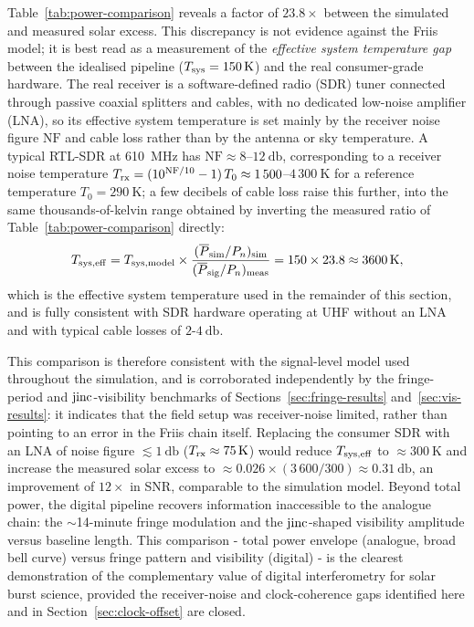 Table~\ref{tab:power-comparison} reveals a factor of $23.8\times$ between the
simulated and measured solar excess. This discrepancy is not evidence against the
Friis model; it is best read as a measurement of the \emph{effective system
temperature gap} between the idealised pipeline ($T_{\rm sys}=\SI{150}{\kelvin}$) and
the real consumer-grade hardware. The real receiver is a software-defined radio (SDR)
tuner connected through passive coaxial splitters and cables, with no dedicated
low-noise amplifier (LNA), so its effective system temperature is set mainly by the
receiver noise figure $\mathrm{NF}$ and cable loss rather than by the antenna or sky
temperature. A typical RTL-SDR at \SI{610}{\mega\hertz} has
$\mathrm{NF}\approx8$--$12~\si{\decibel}$, corresponding to a receiver noise
temperature $T_{\rm rx}=(10^{\mathrm{NF}/10}-1)\,T_0\approx1\,500$--$4\,300~\si{\kelvin}$
for a reference temperature $T_0=\SI{290}{\kelvin}$; a few decibels of cable loss
raise this further, into the same thousands-of-kelvin range obtained by inverting the
measured ratio of Table~\ref{tab:power-comparison} directly:
\begin{equation}
  T_{\rm sys,eff} = T_{\rm sys,model}
    \times\frac{(\overline{P}_{\rm sim}/P_n)_{\rm sim}}
               {(\overline{P}_{\rm sig}/P_n)_{\rm meas}}
  = 150\times23.8 \approx \SI{3\,600}{\kelvin},
  \label{eq:tsys-backcalc}
\end{equation}
which is the effective system temperature used in the remainder of this section, and
is fully consistent with SDR hardware operating at UHF without an LNA and with
typical cable losses of $2$-$4~\si{\decibel}$.

This comparison is therefore consistent with the signal-level model used throughout
the simulation, and is corroborated independently by the fringe-period and
$\operatorname{jinc}$-visibility benchmarks of Sections~\ref{sec:fringe-results}
and~\ref{sec:vis-results}: it indicates that the field setup was receiver-noise
limited, rather than pointing to an error in the Friis chain itself. Replacing the
consumer SDR with an LNA of noise figure $\lesssim\SI{1}{\decibel}$
($T_{\rm rx}\approx\SI{75}{\kelvin}$) would reduce $T_{\rm sys,eff}$ to
$\approx\SI{300}{\kelvin}$ and increase the measured solar excess to
$\approx0.026\times(3\,600/300)\approx\SI{0.31}{\decibel}$, an improvement of
$12\times$ in SNR, comparable to the simulation model. Beyond total power, the
digital pipeline recovers information inaccessible to the analogue chain: the
$\sim$14-minute fringe modulation and the $\operatorname{jinc}$-shaped visibility amplitude versus
baseline length. This comparison - total power envelope (analogue, broad bell curve)
versus fringe pattern and visibility (digital) - is the clearest demonstration of the
complementary value of digital interferometry for solar burst science, provided the
receiver-noise and clock-coherence gaps identified here and in
Section~\ref{sec:clock-offset} are closed.

